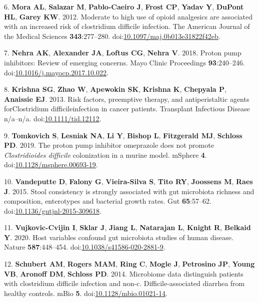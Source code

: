 \documentclass[
  11pt,
]{article}
\begin{document}
\leavevmode\hypertarget{ref-Mora2012}{}%
6. \textbf{Mora AL}, \textbf{Salazar M}, \textbf{Pablo-Caeiro J},
\textbf{Frost CP}, \textbf{Yadav Y}, \textbf{DuPont HL}, \textbf{Garey
KW}. 2012. Moderate to high use of opioid analgesics are associated with
an increased risk of clostridium difficile infection. The American
Journal of the Medical Sciences \textbf{343}:277--280.
doi:\href{https://doi.org/10.1097/maj.0b013e31822f42eb}{10.1097/maj.0b013e31822f42eb}.

\leavevmode\hypertarget{ref-Nehra2018}{}%
7. \textbf{Nehra AK}, \textbf{Alexander JA}, \textbf{Loftus CG},
\textbf{Nehra V}. 2018. Proton pump inhibitors: Review of emerging
concerns. Mayo Clinic Proceedings \textbf{93}:240--246.
doi:\href{https://doi.org/10.1016/j.mayocp.2017.10.022}{10.1016/j.mayocp.2017.10.022}.

\leavevmode\hypertarget{ref-Krishna2013}{}%
8. \textbf{Krishna SG}, \textbf{Zhao W}, \textbf{Apewokin SK},
\textbf{Krishna K}, \textbf{Chepyala P}, \textbf{Anaissie EJ}. 2013.
Risk factors, preemptive therapy, and antiperistaltic agents
forClostridium difficileinfection in cancer patients. Transplant
Infectious Disease n/a--n/a.
doi:\href{https://doi.org/10.1111/tid.12112}{10.1111/tid.12112}.

\leavevmode\hypertarget{ref-Tomkovich2019}{}%
9. \textbf{Tomkovich S}, \textbf{Lesniak NA}, \textbf{Li Y},
\textbf{Bishop L}, \textbf{Fitzgerald MJ}, \textbf{Schloss PD}. 2019.
The proton pump inhibitor omeprazole does not promote
\emph{Clostridioides difficile} colonization in a murine model. mSphere
\textbf{4}.
doi:\href{https://doi.org/10.1128/msphere.00693-19}{10.1128/msphere.00693-19}.

\leavevmode\hypertarget{ref-Vandeputte2015}{}%
10. \textbf{Vandeputte D}, \textbf{Falony G}, \textbf{Vieira-Silva S},
\textbf{Tito RY}, \textbf{Joossens M}, \textbf{Raes J}. 2015. Stool
consistency is strongly associated with gut microbiota richness and
composition, enterotypes and bacterial growth rates. Gut
\textbf{65}:57--62.
doi:\href{https://doi.org/10.1136/gutjnl-2015-309618}{10.1136/gutjnl-2015-309618}.

\leavevmode\hypertarget{ref-VujkovicCvijin2020}{}%
11. \textbf{Vujkovic-Cvijin I}, \textbf{Sklar J}, \textbf{Jiang L},
\textbf{Natarajan L}, \textbf{Knight R}, \textbf{Belkaid Y}. 2020. Host
variables confound gut microbiota studies of human disease. Nature
\textbf{587}:448--454.
doi:\href{https://doi.org/10.1038/s41586-020-2881-9}{10.1038/s41586-020-2881-9}.

\leavevmode\hypertarget{ref-Schubert2014}{}%
12. \textbf{Schubert AM}, \textbf{Rogers MAM}, \textbf{Ring C},
\textbf{Mogle J}, \textbf{Petrosino JP}, \textbf{Young VB},
\textbf{Aronoff DM}, \textbf{Schloss PD}. 2014. Microbiome data
distinguish patients with clostridium difficile infection and non-c.
Difficile-associated diarrhea from healthy controls. mBio \textbf{5}.
doi:\href{https://doi.org/10.1128/mbio.01021-14}{10.1128/mbio.01021-14}.
\end{document}
